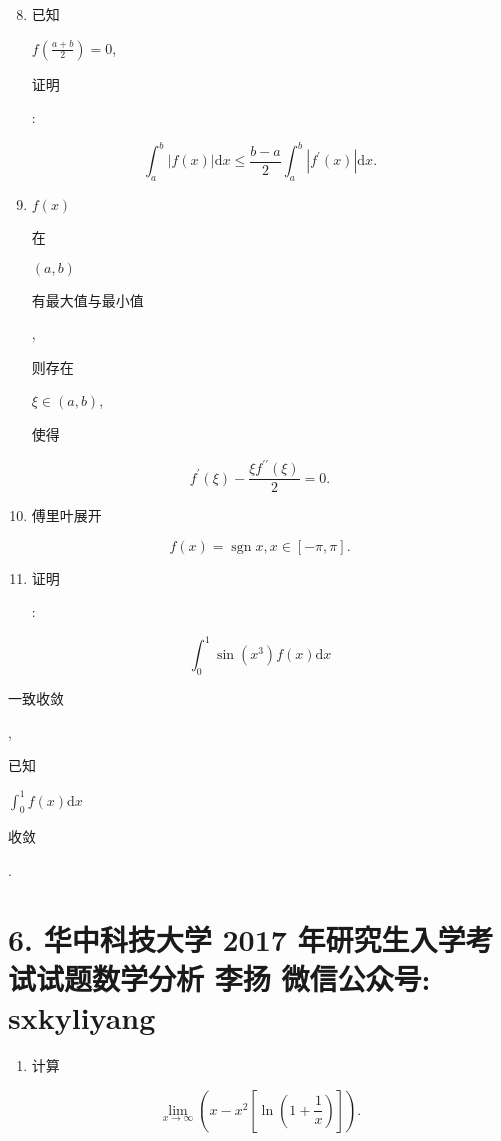 \documentclass[10pt]{article}
\begin{document}
\begin{enumerate}
  \setcounter{enumi}{7}
  \item \begin{CJK}{UTF8}{mj}已知\end{CJK} $f\left(\frac{a+b}{2}\right)=0$, \begin{CJK}{UTF8}{mj}证明\end{CJK}:
\end{enumerate}
$$
\int_{a}^{b}|f(x)| \mathrm{d} x \leq \frac{b-a}{2} \int_{a}^{b}\left|f^{\prime}(x)\right| \mathrm{d} x .
$$

\begin{enumerate}
  \setcounter{enumi}{8}
  \item $f(x)$ \begin{CJK}{UTF8}{mj}在\end{CJK} $(a, b)$ \begin{CJK}{UTF8}{mj}有最大值与最小值\end{CJK}, \begin{CJK}{UTF8}{mj}则存在\end{CJK} $\xi \in(a, b)$, \begin{CJK}{UTF8}{mj}使得\end{CJK}
\end{enumerate}
$$
f^{\prime}(\xi)-\frac{\xi f^{\prime \prime}(\xi)}{2}=0 .
$$

\begin{enumerate}
  \setcounter{enumi}{9}
  \item \begin{CJK}{UTF8}{mj}傅里叶展开\end{CJK}
\end{enumerate}
$$
f(x)=\operatorname{sgn} x, x \in[-\pi, \pi] .
$$

\begin{enumerate}
  \setcounter{enumi}{10}
  \item \begin{CJK}{UTF8}{mj}证明\end{CJK}:
\end{enumerate}
$$
\int_{0}^{1} \sin \left(x^{3}\right) f(x) \mathrm{d} x
$$
\begin{CJK}{UTF8}{mj}一致收敛\end{CJK}, \begin{CJK}{UTF8}{mj}已知\end{CJK} $\int_{0}^{1} f(x) \mathrm{d} x$ \begin{CJK}{UTF8}{mj}收敛\end{CJK}.

\section{6. 华中科技大学 2017 年研究生入学考试试题数学分析 
 李扬 
 微信公众号: sxkyliyang}
\begin{enumerate}
  \item \begin{CJK}{UTF8}{mj}计算\end{CJK}
\end{enumerate}
$$
\lim _{x \rightarrow \infty}\left(x-x^{2}\left[\ln \left(1+\frac{1}{x}\right)\right]\right) .
$$
\end{document}
